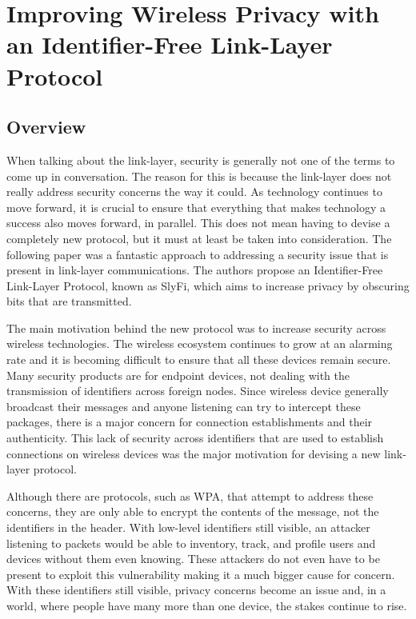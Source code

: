 \section {Improving Wireless Privacy with an Identifier-Free Link-Layer Protocol}
\subsection {Overview}
\smallskip

When talking about the link-layer, security is generally not one of the terms to come up in conversation. The reason for this is because the link-layer does not really address security concerns the way it could. As technology continues to move forward, it is crucial to ensure that everything that makes technology a success also moves forward, in parallel. This does not mean having to devise a completely new protocol, but it must at least be taken into consideration. The following paper was a fantastic approach to addressing a security issue that is present in link-layer communications. The authors propose an Identifier-Free Link-Layer Protocol, known as SlyFi, which aims to increase privacy by obscuring bits that are transmitted.

\smallskip

The main motivation behind the new protocol was to increase security across wireless technologies. The wireless ecosystem continues to grow at an alarming rate and it is becoming difficult to ensure that all these devices remain secure. Many security products are for endpoint devices, not dealing with the transmission of identifiers across foreign nodes. Since wireless device generally broadcast their messages and anyone listening can try to intercept these packages, there is a major concern for connection establishments and their authenticity. This lack of security across identifiers that are used to establish connections on wireless devices was the major motivation for devising a new link-layer protocol. 

\smallskip

Although there are protocols, such as WPA, that attempt to address these concerns, they are only able to encrypt the contents of the message, not the identifiers in the header. With low-level identifiers still visible, an attacker listening to packets would be able to inventory, track, and profile users and devices without them even knowing. These attackers do not even have to be present to exploit this vulnerability making it a much bigger cause for concern. With these identifiers still visible, privacy concerns become an issue and, in a world, where people have many more than one device, the stakes continue to rise.

